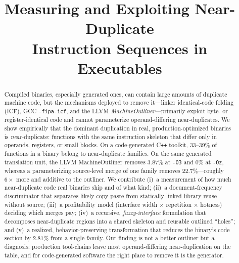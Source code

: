 \documentclass[conference]{IEEEtran}
\begin{document}
\title{Measuring and Exploiting Near-Duplicate\\Instruction Sequences in Executables}

\author{%
  \and
}
\maketitle

\begin{abstract}
Compiled binaries, especially generated ones, can contain large amounts of
duplicate machine code, but the mechanisms deployed to remove it---linker
identical-code folding (ICF), GCC \texttt{-fipa-icf}, and the LLVM
\emph{MachineOutliner}---primarily exploit byte- or register-identical code
and cannot parameterize operand-differing near-duplicates. We show empirically
that the dominant duplication in real, production-optimized binaries is
\emph{near}-duplicate: functions with the same instruction skeleton that
differ only in operands, registers, or small blocks. On a code-generated
C\texttt{++} toolkit, $33$--$39\%$ of functions in a binary belong to
near-duplicate families. On the same generated translation unit, the LLVM
MachineOutliner removes $3.87\%$ at \texttt{-O3} and $0\%$ at \texttt{-Oz},
whereas a parameterizing source-level merge of one family removes
$22.7\%$---roughly $6\times$ more and additive to the outliner. We contribute
(i)~a measurement of how much near-duplicate code real binaries ship and of
what kind; (ii)~a document-frequency discriminator that separates likely
copy-paste from statically-linked library reuse without source; (iii)~a
profitability model (interface width $\times$ repetition $\times$ hotness)
deciding which merges pay; (iv)~a recursive, \emph{fuzzy-interface}
formulation that decomposes near-duplicate regions into a shared skeleton and
reusable outlined ``holes''; and (v)~a realized, behavior-preserving
transformation that reduces the binary's code section by $2.81\%$ from a
single family. Our finding is not a better outliner but a diagnosis:
production tool-chains leave most operand-differing near-duplication on the
table, and for code-generated software the right place to remove it is the
generator.
\end{abstract}
\end{document}
